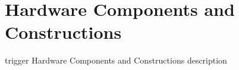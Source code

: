 \section{Hardware Components and Constructions}

trigger Hardware Components and Constructions description

